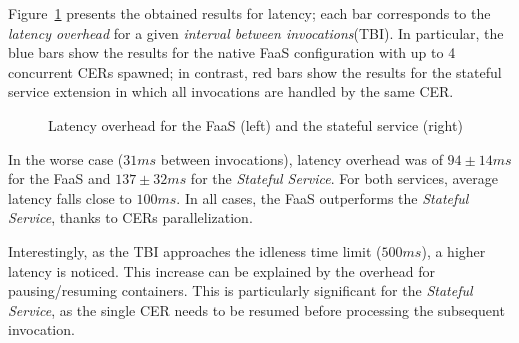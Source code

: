 Figure~\ref{fig:RESULTS_LATENCY} presents the obtained results for latency; each bar corresponds to the \textit{latency overhead} for a given \textit{interval between invocations}(TBI). In particular, the blue bars show the results for the native FaaS configuration with up to 4 concurrent CERs spawned; in contrast, red bars show the results for the stateful service extension in which all invocations are handled by the same CER.

\begin{figure}[bth]
\centering
{}
\caption{Latency overhead for the FaaS (left) and the stateful service (right)}
\label{fig:RESULTS_LATENCY}
\end{figure}

In the worse case ($31ms$ between invocations), latency overhead was of $94\pm14ms$ for the FaaS and $137\pm32ms$ for the \textit{Stateful Service}. For both services, average latency falls close to $100ms$. In all cases, the FaaS outperforms the \textit{Stateful Service}, thanks to CERs parallelization.

Interestingly, as the TBI approaches the idleness time limit ($500ms$), a higher latency is noticed. This increase can be explained by the overhead for pausing/resuming containers. This is particularly significant for the \textit{Stateful Service}, as the single CER needs to be resumed before processing the subsequent invocation. 

